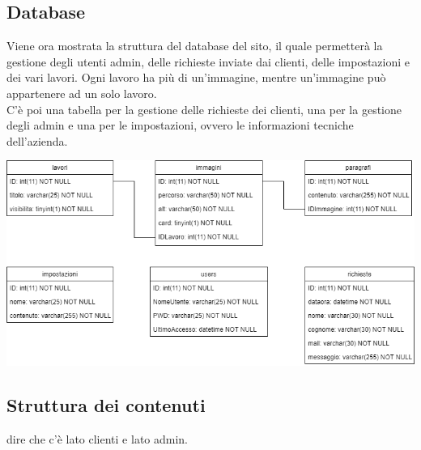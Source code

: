 \subsection{Database}
Viene ora mostrata la struttura del database del sito, il quale permetterà la gestione degli utenti admin, delle richieste inviate dai clienti, delle impostazioni e dei vari lavori. Ogni lavoro ha più di un'immagine, mentre un'immagine può appartenere ad un solo lavoro.\\C'è poi una tabella per la gestione delle richieste dei clienti, una per la gestione degli admin e una per le impostazioni, ovvero le informazioni tecniche dell'azienda.
\begin{center}
\includegraphics[scale = 0.5]{../latex/images/db.png}\\[1.5cm]
\end{center}

\subsection{Struttura dei contenuti}
dire che c'è lato clienti e lato admin.

